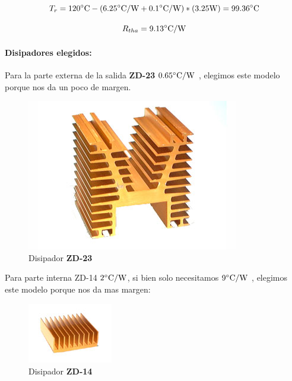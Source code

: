 \begin{equation*}
T_r = 120 \si[per-mode=symbol]{\celsius} - (6.25 \si[per-mode=symbol]{\celsius\per\watt} + 0.1 \si[per-mode=symbol]{\celsius\per\watt})*(3.25 \si[per-mode=symbol]{\watt}) = 99.36 \si[per-mode=symbol]{\celsius}
\end{equation*}

\begin{equation*}
R_{tha} = 9.13 \si[per-mode=symbol]{\celsius\per\watt}
\end{equation*}

\paragraph{Disipadores elegidos:}

Para la parte externa de la salida \textbf{ZD-23} $0.65 \si[per-mode=symbol]{\celsius\per\watt}$ , elegimos este modelo porque nos da un poco de margen.

\begin{figure}[H]
    \centering
    \includegraphics[height=0.4\textwidth]{img/zd23.jpg}
    \caption{Disipador \textbf{ZD-23}}
    \label{fig:diszd23}
\end{figure}


Para parte interna ZD-14 $2 \si[per-mode=symbol]{\celsius\per\watt}$, si bien solo necesitamos $9 \si[per-mode=symbol]{\celsius\per\watt}$ , elegimos este modelo porque nos da mas margen:

\begin{figure}[H]
    \centering
    \includegraphics[height=0.4\textwidth]{img/zd14.jpg}
    \caption{Disipador \textbf{ZD-14}}
    \label{fig:diszd14}
\end{figure}